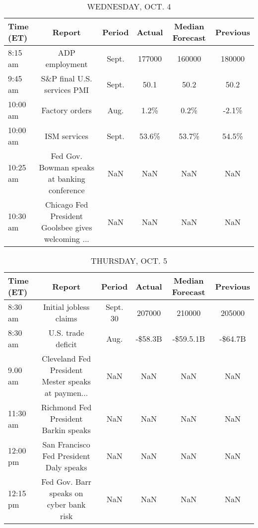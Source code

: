 \documentclass{article}%
\begin{document}
%


\begin{table}[htbp]%
\caption{WEDNESDAY, OCT. 4}%
\centering%
\begin{adjustbox}{width=1\textwidth}%
\begin{tabular}{lccccc}
\toprule
Time (ET) &                                             Report & Period & Actual & Median Forecast & Previous \\
\midrule
  8:15 am &                                     ADP employment &  Sept. & 177000 &          160000 &   180000 \\
  9:45 am &                        S\&P final U.S. services PMI &  Sept. &   50.1 &            50.2 &     50.2 \\
 10:00 am &                                     Factory orders &   Aug. &   1.2\% &            0.2\% &    -2.1\% \\
 10:00 am &                                       ISM services &  Sept. &  53.6\% &           53.7\% &    54.5\% \\
 10:25 am &       Fed Gov. Bowman speaks at banking conference &    NaN &    NaN &             NaN &      NaN \\
 10:30 am & Chicago Fed President Goolsbee gives welcoming ... &    NaN &    NaN &             NaN &      NaN \\
\bottomrule
\end{tabular}
%
\end{adjustbox}%
\end{table}

%


\begin{table}[htbp]%
\caption{THURSDAY, OCT. 5}%
\centering%
\begin{adjustbox}{width=1\textwidth}%
\begin{tabular}{lccccc}
\toprule
Time (ET) &                                             Report &   Period &  Actual & Median Forecast & Previous \\
\midrule
  8:30 am &                             Initial jobless claims & Sept. 30 &  207000 &          210000 &   205000 \\
  8:30 am &                                 U.S. trade deficit &     Aug. & -\$58.3B &       -\$59.5.1B &  -\$64.7B \\
  9.00 am & Cleveland Fed President Mester speaks at paymen... &      NaN &     NaN &             NaN &      NaN \\
 11:30 am &               Richmond Fed President Barkin speaks &      NaN &     NaN &             NaN &      NaN \\
 12:00 pm &            San Francisco Fed President Daly speaks &      NaN &     NaN &             NaN &      NaN \\
 12:15 pm &            Fed Gov. Barr speaks on cyber bank risk &      NaN &     NaN &             NaN &      NaN \\
\bottomrule
\end{tabular}
%
\end{adjustbox}%
\end{table}
\end{document}
